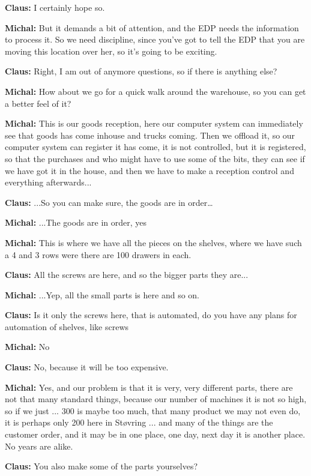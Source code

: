 \textbf{Claus:} I certainly hope so. \nl

\textbf{Michal:} But it demands a bit of attention, and the EDP needs the
information to process it. So we need discipline, since you've got to tell the
EDP that you are moving this location over her, so it's going to be exciting.\nl

\textbf{Claus:} Right, I am out of anymore questions, so if there is anything
else?\nl

\textbf{Michal:} How about we go for a quick walk around the warehouse, so you
can get a better feel of it?\nl

\textbf{Michal:} This is our goods reception, here our computer system can
immediately see that goods has come inhouse and trucks coming. Then we offload
it, so our computer system can register it has come, it is not controlled, but
it is registered, so that the purchases and who might have to use some of the
bits, they can see if we have got it in the house, and then we have to make a
reception control and everything afterwards...\nl

\textbf{Claus:} ...So you can make sure, the goods are in order…\nl

\textbf{Michal:} ...The goods are in order, yes\nl

\textbf{Michal:} This is where we have all the pieces on the shelves, where we
have such a 4 and 3 rows were there are 100 drawers in each.\nl

\textbf{Claus:} All the screws are here, and so the bigger parts they are...\nl

\textbf{Michal:} ...Yep, all the small parts is here and so on.\nl

\textbf{Claus:} Is it only the screws here, that is automated, do you have any
plans for automation of shelves, like screws \nl

\textbf{Michal:} No \nl

\textbf{Claus:} No, because it will be too expensive.\nl

\textbf{Michal:} Yes, and our problem is that it is very, very different parts,
there are not that many standard things, because our number of machines it is
not so high, so if we just ... 300 is maybe too much, that many product we may
not even do, it is perhaps only 200 here in Støvring ... and many of the things
are the customer order, and it may be in one place, one day, next day it is
another place. No years are alike.\nl

\textbf{Claus:} You also make some of the parts yourselves?\nl

